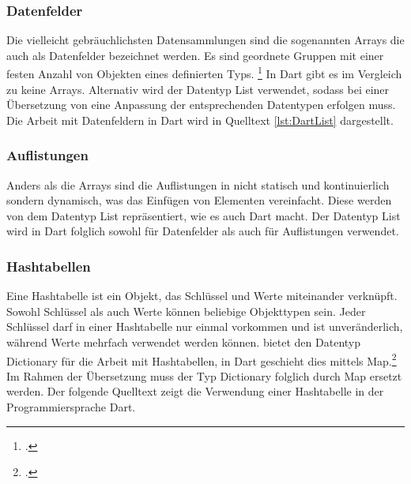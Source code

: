 \subsubsection{Datenfelder}

Die vielleicht gebräuchlichsten Datensammlungen sind die sogenannten \glq Arrays\grq{} die auch als Datenfelder bezeichnet werden.  Es sind geordnete Gruppen mit einer festen Anzahl von Objekten eines definierten Typs. \footcite[Vgl.][S. 110f]{Kühnel2019} In Dart gibt es im Vergleich zu \Csharp{} keine \glq Arrays\grq{}.  Alternativ  wird der Datentyp \glq List\grq{}  verwendet,  sodass bei einer Übersetzung von \Csharp{} eine Anpassung der entsprechenden Datentypen erfolgen muss.  Die Arbeit mit Datenfeldern in Dart wird in Quelltext \ref{lst:DartList} dargestellt.



\subsubsection{Auflistungen}
Anders als die \glq Arrays\grq{}  sind die Auflistungen in \Csharp{} nicht statisch und kontinuierlich sondern dynamisch, was das Einfügen von Elementen vereinfacht.   Diese werden von dem Datentyp \glq List\grq{} repräsentiert,  wie es auch Dart macht.  Der Datentyp \glq List\grq{}  wird in Dart folglich sowohl für Datenfelder als auch für Auflistungen verwendet.

\subsubsection{Hashtabellen}

Eine Hashtabelle ist ein Objekt, das Schlüssel und Werte miteinander verknüpft. Sowohl Schlüssel als auch Werte können beliebige Objekttypen sein.  Jeder Schlüssel darf in einer Hashtabelle nur einmal vorkommen und ist unveränderlich,  während Werte mehrfach verwendet werden können.  
\Csharp{} bietet den Datentyp \glq Dictionary\grq{}  für die Arbeit mit Hashtabellen, in  Dart geschieht dies mittels \glq Map\grq.\footcite[Vgl. ][Abgerufen am \today]{GoogleFlutterTour2020} Im Rahmen der Übersetzung muss der Typ Dictionary folglich durch \glq Map\grq{} ersetzt werden.  Der folgende Quelltext zeigt die Verwendung einer Hashtabelle in der Programmiersprache Dart.



